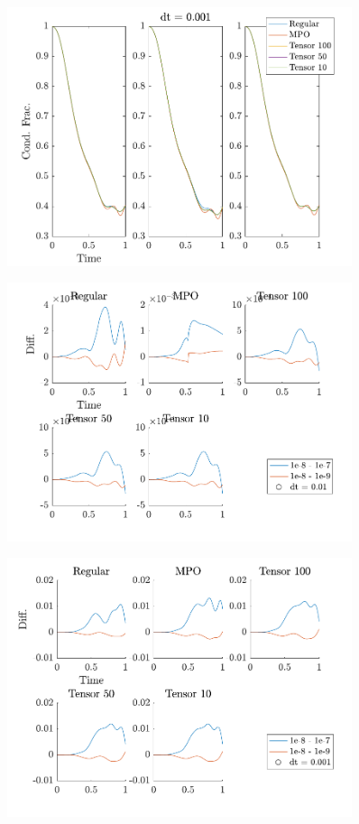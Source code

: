 \begin{figure}[h]
	\centering
	\includegraphics[width=0.9\textwidth]{Figures/TimeEvolve2.pdf}
	\caption{\textit{}}
	\label{fig:TimeEvolve2}
\end{figure}

\begin{figure}[h]
	\centering
	\includegraphics[width=0.9\textwidth]{Figures/CompareCutoffs1.pdf}
	\caption{\textit{}}
	\label{fig:Cutoff1}
\end{figure}

\begin{figure}[h]
	\centering
	\includegraphics[width=0.9\textwidth]{Figures/CompareCutoffs2.pdf}
	\caption{\textit{}}
	\label{fig:Cutoff2}
\end{figure}


